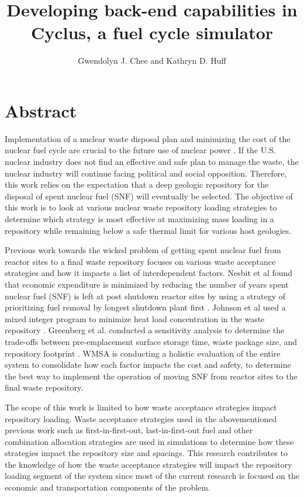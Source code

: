 \documentclass{anstrans}
\title{Developing back-end capabilities in Cyclus, a fuel cycle simulator}
\author{Gwendolyn J. Chee and Kathryn D. Huff}
\institute{
    Dept. of Nuclear, Plasma and Radiological Engineering, University of Illinois at Urbana-Champaign \\
    gchee2@illinois.edu
    }
\begin{document}
    \section{Abstract}
    Implementation of a nuclear waste disposal plan and minimizing the cost of the 
    nuclear fuel cycle are crucial to the future use of nuclear power 
    \cite{massachusetts_institute_of_technology_future_2003}. 
    If the U.S. nuclear industry does not find an effective and safe plan to manage 
    the waste, the nuclear industry will continue facing political and social 
    opposition. 
    Therefore, this work relies on the expectation that a deep geologic repository 
    for the disposal of spent nuclear fuel (SNF) will eventually be selected. 
    The objective of this work is to look at various nuclear waste repository loading 
    strategies to determine which strategy is most effective at maximizing 
    mass loading in a repository while remaining below a safe thermal limit 
    for various host geologies. 
    
    Previous work towards the wicked problem of getting spent nuclear fuel from reactor 
    sites to a final waste repository focuses on various waste acceptance strategies 
    and how it impacts a list of interdependent factors. 
    Nesbit et al found that economic expenditure is minimized by reducing the 
    number of years spent nuclear fuel (SNF) is left at post shutdown reactor 
    sites by using a strategy of prioritizing fuel removal by longest shutdown plant 
    first \cite{nesbit_proposed_2015}. 
    Johnson et al used a mixed integer program to minimize heat load concentration 
    in the waste repository \cite{johnson_optimizing_2016}. 
    Greenberg et al. conducted a sensitivity analysis to determine the trade-offs 
    between pre-emplacement surface storage time, waste package size, and repository 
    footprint \cite{greenberg_application_2012}. 
    WMSA is conducting a holistic evaluation of the entire system to consolidate 
    how each factor impacts the cost and safety, to determine the best 
    way to implement the operation of moving SNF from reactor sites to the final 
    waste repository\cite{nutt_waste_2015}. 
    
    The scope of this work is limited to how waste acceptance strategies impact 
    repository loading. 
    Waste acceptance strategies used in the abovementioned previous work such as 
    first-in-first-out, last-in-first-out fuel and other combination allocation 
    strategies are used in simulations to determine how these strategies impact 
    the repository size and spacings. 
    This research contributes to the knowledge of how the waste acceptance 
    strategies will impact the repository loading segment of the system since 
    most of the current research is focused on the economic and transportation 
    components of the problem. 
    
\end{document}
